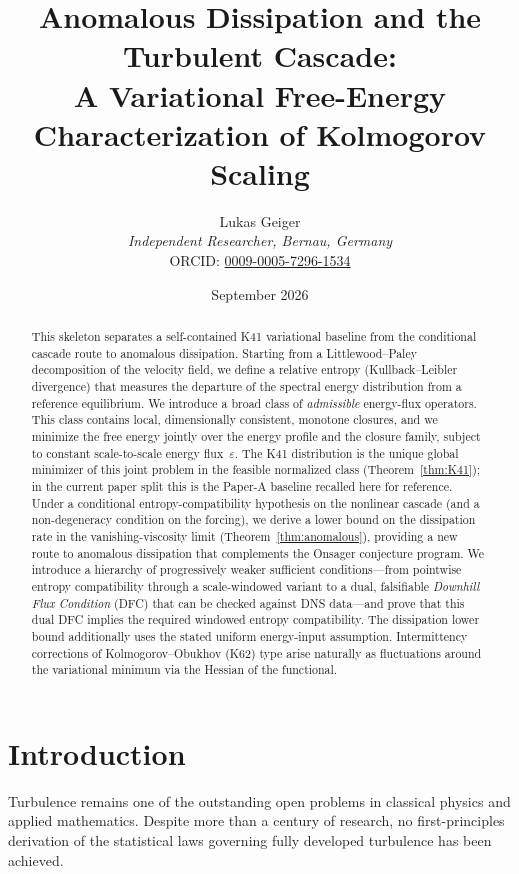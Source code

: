 \documentclass[12pt,a4paper]{article}
\title{Anomalous Dissipation and the Turbulent Cascade:\\
A Variational Free-Energy Characterization of Kolmogorov Scaling}
\author{Lukas Geiger\\
\textit{Independent Researcher, Bernau, Germany}\\
ORCID: \href{https://orcid.org/0009-0005-7296-1534}{0009-0005-7296-1534}}
\date{September 2026}
\theoremstyle{breakdef}
\theoremstyle{breakplain}
\theoremstyle{breakdef}
\begin{document}
\maketitle

\begin{abstract}
This skeleton separates a self-contained K41 variational baseline from the
conditional cascade route to anomalous dissipation.  Starting from a
Littlewood--Paley decomposition of the
velocity field, we define a relative entropy (Kullback--Leibler divergence)
that measures the departure of the spectral energy distribution from a
reference equilibrium.  We introduce a broad class of \emph{admissible}
energy-flux operators.  This class contains local, dimensionally consistent,
monotone closures, and we minimize the free energy jointly over the energy
profile and the closure family, subject to constant scale-to-scale energy
flux~$\varepsilon$.  The K41 distribution is the unique global minimizer
of this joint problem in the feasible normalized class
(Theorem~\ref{thm:K41}); in the current paper split this is the Paper-A
baseline recalled here for reference.  Under a conditional entropy-compatibility hypothesis on the
nonlinear cascade (and a non-degeneracy condition on the forcing),
we derive a lower bound on the dissipation rate in the
vanishing-viscosity limit (Theorem~\ref{thm:anomalous}), providing
a new route to anomalous dissipation that complements the Onsager
    conjecture program.  We introduce a hierarchy of progressively
    weaker sufficient conditions---from pointwise entropy compatibility
    through a scale-windowed variant to a dual, falsifiable \emph{Downhill
    Flux Condition} (DFC) that can be checked against DNS data---and prove
    that this dual DFC implies the required windowed entropy compatibility.
    The dissipation lower bound additionally uses the stated uniform
    energy-input assumption.
Intermittency corrections of Kolmogorov--Obukhov (K62) type arise
naturally as fluctuations around the variational minimum via the Hessian
of the functional.
\end{abstract}
\clearpage
\tableofcontents
\clearpage


\section{Introduction}\label{sec:intro}

Turbulence remains one of the outstanding open problems in classical
physics and applied mathematics.  Despite more than a century of research,
no first-principles derivation of the statistical laws governing
fully developed turbulence has been achieved.
\end{document}
